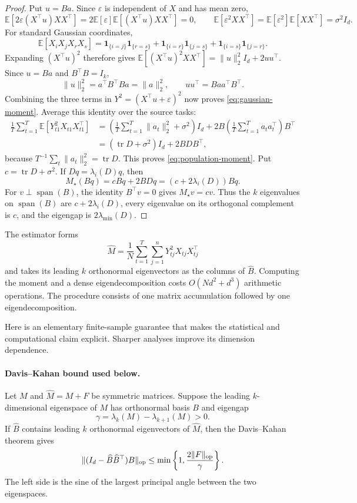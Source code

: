 \documentclass[11pt,twoside]{article}
\newcommand{\E}{\mathbb E}
\theoremstyle{definition}
\theoremstyle{remark}
\begin{document}
\begin{proof}
Put $u=Ba$. Since $\varepsilon$ is independent of $X$ and has mean zero,
\[
 \E[2\varepsilon(X^\top u)XX^\top]
 =2\E[\varepsilon]\E[(X^\top u)XX^\top]=0,
 \qquad
 \E[\varepsilon^2XX^\top]
 =\E[\varepsilon^2]\E[XX^\top]=\sigma^2I_d.
\]
For standard Gaussian coordinates,
\[
 \E[X_iX_jX_rX_s]
 =\mathbf1_{\{i=j\}}\mathbf1_{\{r=s\}}
  +\mathbf1_{\{i=r\}}\mathbf1_{\{j=s\}}
  +\mathbf1_{\{i=s\}}\mathbf1_{\{j=r\}}.
\]
Expanding $(X^\top u)^2$ therefore gives
$\E[(X^\top u)^2XX^\top]=\|u\|_2^2I_d+2uu^\top$.
Since $u=Ba$ and $B^\top B=I_k$,
\[
 \|u\|_2^2=a^\top B^\top Ba=\|a\|_2^2,
 \qquad
 uu^\top=Baa^\top B^\top.
\]
Combining the three terms in $Y^2=(X^\top u+\varepsilon)^2$ now proves
\cref{eq:gaussian-moment}.
Average this identity over the source tasks:
\begin{align*}
 \frac1T\sum_{t=1}^T\E[Y_{t1}^2X_{t1}X_{t1}^\top]
 &=
 \left(\frac1T\sum_{t=1}^T\|a_t\|_2^2+\sigma^2\right)I_d
 +2B\left(\frac1T\sum_{t=1}^Ta_ta_t^\top\right)B^\top\\
 &=(\operatorname{tr}D+\sigma^2)I_d+2BDB^\top,
\end{align*}
because $T^{-1}\sum_t\|a_t\|_2^2=\operatorname{tr}D$. This proves
\cref{eq:population-moment}. Put $c=\operatorname{tr}D+\sigma^2$.
If $Dq=\lambda_i(D)q$, then
\[
 M_\star(Bq)=cBq+2BDq=(c+2\lambda_i(D))Bq.
\]
For $v\perp\operatorname{span}(B)$, the identity $B^\top v=0$ gives
$M_\star v=cv$. Thus the $k$ eigenvalues on $\operatorname{span}(B)$ are
$c+2\lambda_i(D)$, every eigenvalue on its orthogonal complement is $c$,
and the eigengap is $2\lambda_{\min}(D)$.
\end{proof}

The estimator forms
\begin{equation}
 \widehat M=\frac1N\sum_{t=1}^T\sum_{j=1}^n
                 Y_{tj}^2X_{tj}X_{tj}^\top
 \label{eq:empirical-moment}
\end{equation}
and takes its leading $k$ orthonormal eigenvectors as the columns of
$\widehat B$. Computing the moment and a dense eigendecomposition costs
$O(Nd^2+d^3)$ arithmetic operations. The procedure consists of one matrix
accumulation followed by one eigendecomposition.

Here is an elementary finite-sample guarantee that makes the statistical and
computational claim explicit. Sharper analyses improve its dimension
dependence.

\paragraph{Davis--Kahan bound used below.}
Let $M$ and $\widehat M=M+F$ be symmetric matrices. Suppose the leading
$k$-dimensional eigenspace of $M$ has orthonormal basis $B$ and eigengap
\[
 \gamma=\lambda_k(M)-\lambda_{k+1}(M)>0.
\]
If $\widehat B$ contains leading $k$ orthonormal eigenvectors of $\widehat M$,
then the Davis--Kahan theorem gives
\begin{equation}
 \|(I_d-\widehat B\widehat B^\top)B\|_{\rm op}
 \le
 \min\left\{1,\frac{2\|F\|_{\rm op}}{\gamma}\right\}.
 \label{eq:davis-kahan-bound}
\end{equation}
The left side is the sine of the largest principal angle between the two
eigenspaces.
\end{document}
